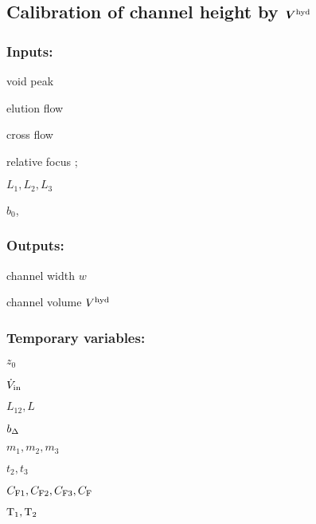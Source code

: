 \subsection*{Calibration of channel height by $\bm{V^\text{hyd}}$}
\subsubsection*{Inputs:}
\label{sec:CalibVhyd}
\begin{multicols}{3}
  \begin{packed_item}
    \item void peak \tvoid
    \item elution flow \Ve
    \item cross flow \Vc
    \item relative focus \zP;
    \item $L_1, L_2, L_3$
    \item $b_0$, \bL
  \end{packed_item}
\end{multicols}

\subsubsection*{Outputs:}
\begin{multicols}{3}
  \begin{packed_item}
    \item channel width $w$
    \item channel volume $V^\text{hyd}$
  \end{packed_item}
\end{multicols}

\subsubsection*{Temporary variables:}
\begin{multicols}{3}
  \begin{packed_item}
  \item $z_0$
  \item $\dot{V}_\text{in}$
  \item $L_{12}, L$  
  \item $b_\Delta$
  \item $m_1, m_2, m_3$
  \item $t_2, t_3$
  \item $C_\text{F1}, C_\text{F2}, C_\text{F3}, C_\text{F}$
 \item $\text{T}_{1}, \text{T}_{2}$
  \end{packed_item}
\end{multicols}

